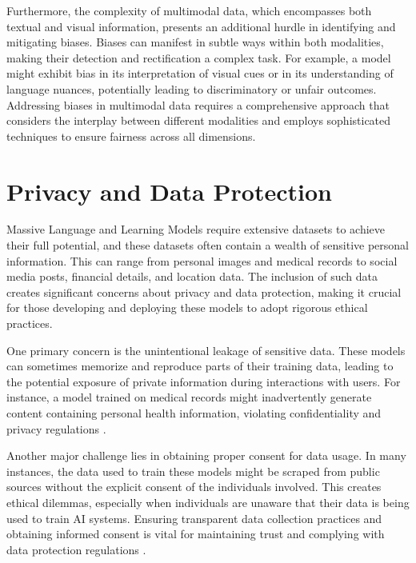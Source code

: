 Furthermore, the complexity of multimodal data, which encompasses both textual and visual information, presents an additional hurdle in identifying and mitigating biases. Biases can manifest in subtle ways within both modalities, making their detection and rectification a complex task. For example, a model might exhibit bias in its interpretation of visual cues or in its understanding of language nuances, potentially leading to discriminatory or unfair outcomes. Addressing biases in multimodal data requires a comprehensive approach that considers the interplay between different modalities and employs sophisticated techniques to ensure fairness across all dimensions.

\section{Privacy and Data Protection}

Massive Language and Learning Models require extensive datasets to achieve their full potential, and these datasets often contain a wealth of sensitive personal information. This can range from personal images and medical records to social media posts, financial details, and location data. The inclusion of such data creates significant concerns about privacy and data protection, making it crucial for those developing and deploying these models to adopt rigorous ethical practices.

One primary concern is the unintentional leakage of sensitive data. These models can sometimes memorize and reproduce parts of their training data, leading to the potential exposure of private information during interactions with users. For instance, a model trained on medical records might inadvertently generate content containing personal health information, violating confidentiality and privacy regulations \cite{brown2022does, yao2024survey, pan2020privacy}.

Another major challenge lies in obtaining proper consent for data usage. In many instances, the data used to train these models might be scraped from public sources without the explicit consent of the individuals involved. This creates ethical dilemmas, especially when individuals are unaware that their data is being used to train AI systems. Ensuring transparent data collection practices and obtaining informed consent is vital for maintaining trust and complying with data protection regulations \cite{weidinger2021ethical,brown2022does,zhang2024right,weidinger2022taxonomy}.



